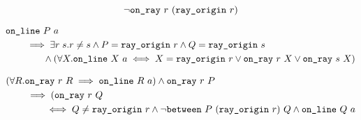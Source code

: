\begin{equation}\label{eq:OriginNotOnRay}
\neg\texttt{on\_ray}\ r\ (\texttt{ray\_origin}\ r)
\end{equation}

\begin{equation}\label{eq:RayCover}
  \begin{split}
    &\texttt{on\_line}\ P\ a\\
    &\qquad\implies \exists r\;s. r \neq s\wedge P = \texttt{ray\_origin}\ r \wedge Q = \texttt{ray\_origin}\ s\\
    &\qquad\qquad \wedge (\forall X. \texttt{on\_line}\ X\ a \iff X = \texttt{ray\_origin}\ r \vee \texttt{on\_ray}\ r\ X \vee \texttt{on\_ray}\ s\ X)
    \end{split}
\end{equation}

\begin{equation}\label{eq:OnRayNotBet}
  \begin{split}
    &(\forall R. \texttt{on\_ray}\ r\ R \implies \texttt{on\_line}\ R\ a) \wedge \texttt{on\_ray}\ r\ P\\
    &\qquad\implies (\texttt{on\_ray}\ r\ Q\\
    &\qquad\qquad\iff Q \neq \texttt{ray\_origin}\ r \wedge \neg\texttt{between}\ P\ (\texttt{ray\_origin}\ r)\ Q \wedge \texttt{on\_line}\ Q\ a
  \end{split}
\end{equation}
